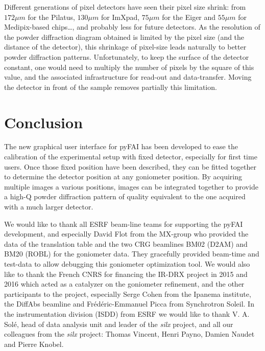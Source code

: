 \documentclass[preprint, pdf]{iucr}              %
\begin{document}
Different generations of pixel detectors have seen their pixel size
shrink:
from $172 \mu m$ for the Pilatus, $130 \mu m$ for ImXpad, $75 \mu m$ for the
Eiger and $55 \mu m$ for Medipix-based chips\ldots, and probably less for
future detectors.
As the resolution of the powder diffraction diagram obtained is limited by the
pixel size (and the distance of the detector), this shrinkage of pixel-size
leads naturally to better powder diffraction patterns.
Unfortunately, to keep the surface of the detector constant, one would need
to multiply the number of pixels by the square of this value, and the
associated infrastructure for read-out and data-transfer.
Moving the detector in front of the sample removes partially this limitation.

\section{Conclusion}

The new graphical user interface for pyFAI has been developed to ease the
calibration of the experimental setup with fixed detector, especially for first
time users.
Once those fixed position have been described, they can be fitted together to
determine the detector position at any goniometer position.
By acquiring multiple images a various positions, images can be
integrated together to provide a high-Q powder diffraction pattern of
quality equivalent to the one acquired with a much larger detector.



We would like to thank all ESRF beam-line teams for supporting the
pyFAI development, and especially David Flot from the MX-group who provided the
data of the translation table and the two CRG beamlines BM02 (D2AM) and BM20
(ROBL) for the goniometer data.
They gracefully provided beam-time and test-data to allow debugging this
goniometer optimization tool.
We would also like to thank the French CNRS for financing the IR-DRX project
in 2015 and 2016 which acted as a catalyzer on the goniometer refinement,
and the other participants to the project, especially Serge Cohen from the
Ipanema institute, the DiffAbs beamline and Frédéric-Emmanuel Picca from
Synchrotron Soleil.
In the instrumentation division (ISDD) from ESRF  we would like to thank V. A.
Solé, head of data analysis unit and leader of the \textit{silx} project, and all our
colleagues from the \textit{silx} project: Thomas Vincent, Henri Payno, Damien Naudet and
Pierre Knobel.



\end{document}
